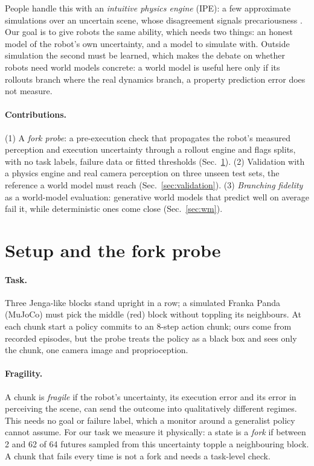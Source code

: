 \documentclass{article}
\begin{document}
People handle this with an \emph{intuitive physics engine} (IPE): a few approximate simulations over an
uncertain scene, whose disagreement signals precariousness
\citep{battaglia2013simulation,smith2013sources,sanborn2013reconciling}. Our goal is to give robots the
same ability, which needs two things: an honest model of the robot's own uncertainty, and a model to
simulate with. Outside simulation the second must be learned, which makes the debate on whether robots
need world models concrete: a world model is useful here only if its rollouts branch where the real
dynamics branch, a property prediction error does not measure.

\paragraph{Contributions.} (1) A \emph{fork probe}: a pre-execution check that propagates the robot's
measured perception and execution uncertainty through a rollout engine and flags splits, with no task
labels, failure data or fitted thresholds (Sec.~\ref{sec:probe}). (2) Validation with a physics engine and
real camera perception on three unseen test sets, the reference a world model must reach
(Sec.~\ref{sec:validation}). (3) \emph{Branching fidelity} as a world-model evaluation: generative world
models that predict well on average fail it, while deterministic ones come close (Sec.~\ref{sec:wm}).

\section{Setup and the fork probe}\label{sec:probe}
\paragraph{Task.} Three Jenga-like blocks stand upright in a row; a simulated Franka Panda (MuJoCo) must
pick the middle (red) block without toppling its neighbours. At each chunk start a policy commits to an 8-step action chunk; ours come from recorded episodes, but the probe treats
the policy as a black box and sees only the chunk, one camera image and proprioception.

\paragraph{Fragility.} A chunk is \emph{fragile} if the robot's uncertainty, its execution error and its
error in perceiving the scene, can send the outcome into qualitatively different regimes. This needs no
goal or failure label, which a monitor around a generalist policy cannot assume. For our task we measure it physically: a state
is a \emph{fork} if between 2 and 62 of 64 futures sampled from this uncertainty topple a
neighbouring block. A chunk that fails every time is not a fork and needs a task-level check.
\end{document}
